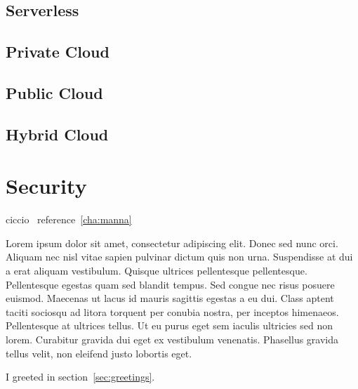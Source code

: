\subsection{Serverless}
\subsection{Private Cloud}
\subsection{Public Cloud}
\subsection{Hybrid Cloud}
\section{Security}

ciccio~\label{cha:manna}
reference~\ref{cha:manna}

Lorem ipsum dolor sit amet, consectetur adipiscing elit. Donec sed nunc orci. Aliquam nec nisl vitae sapien pulvinar dictum quis non urna. Suspendisse at dui a erat aliquam vestibulum. Quisque ultrices pellentesque pellentesque. Pellentesque egestas quam sed blandit tempus. Sed congue nec risus posuere euismod. Maecenas ut lacus id mauris sagittis egestas a eu dui. Class aptent taciti sociosqu ad litora torquent per conubia nostra, per inceptos himenaeos. Pellentesque at ultrices tellus. Ut eu purus eget sem iaculis ultricies sed non lorem. Curabitur gravida dui eget ex vestibulum venenatis. Phasellus gravida tellus velit, non eleifend justo lobortis eget. 


I greeted in section~\ref{sec:greetings}.
